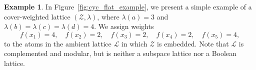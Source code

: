 \documentclass[a4paper,11pt,reqno]{article}
\theoremstyle{definition}
\newtheorem{example}[theorem]{{{Example}}}
\begin{document}
\begin{example}
    In Figure~\ref{fig:cyc_flat_example}, we present a simple example of a cover-weighted lattice $(\mathcal{Z},\lambda)$, where $\lambda(a)=3$ and $\lambda(b)=\lambda(c)=\lambda(d)=4$. We assign weights 
    \[
    f(x_1)=4,\quad f(x_2)=2,\quad f(x_3)=2,\quad f(x_4)=2,\quad f(x_5)=4,
    \]
    to the atoms in the ambient lattice $\mathcal{L}$ in which $\mathcal{Z}$ is embedded. Note that $\mathcal{L}$ is complemented and modular, but is neither a subspace lattice nor a Boolean lattice.

    \begin{figure}[h!]
        \begin{minipage}{0.45\textwidth}
            \begin{center}
            \end{center}
        \end{minipage}
        \begin{minipage}{0.5\textwidth}
            \begin{center}
\end{center}
\end{minipage}
\end{figure}
\end{example}
\end{document}
